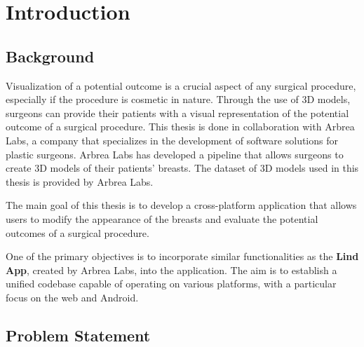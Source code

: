 \setcounter{chapter}{0}

\chapter{Introduction}

\section{Background}

Visualization of a potential outcome is a crucial aspect of any surgical procedure, especially if the procedure is cosmetic in nature. Through the use of 3D models, surgeons can
provide their patients with a visual representation of the potential outcome of a surgical procedure. This thesis is done in collaboration with Arbrea Labs, a company that specializes in the development of
software solutions for plastic surgeons. Arbrea Labs has developed a pipeline that allows surgeons to create 3D models of their patients' breasts. The dataset of 3D models used in this thesis is
provided by Arbrea Labs.



The main goal of this thesis is to develop a cross-platform application that allows users to modify the appearance of the breasts and evaluate the potential outcomes of a surgical procedure.

One of the primary objectives is to incorporate similar functionalities as the \textbf{Lind App}, created by Arbrea Labs, into the application. 
The aim is to establish a unified codebase capable of operating on various platforms, with a particular focus on the web and Android.



\section{Problem Statement}


